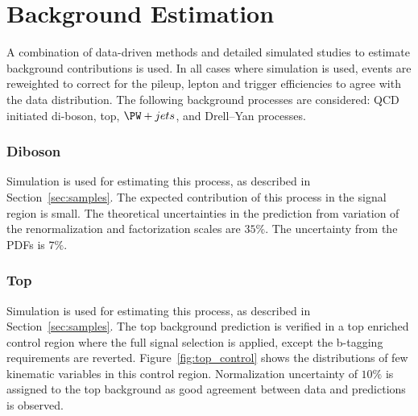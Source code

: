 \chapter{Background Estimation} %
\label{cha:background_estimation}
A combination of data-driven methods and detailed simulated studies to 
estimate background contributions is used. In all cases where simulation is used, events are reweighted to correct for the pileup, lepton and trigger efficiencies to agree with the data distribution. The following background processes are considered: QCD initiated di-boson, top, $\PW+jets$, and Drell--Yan processes. 

\subsection{Diboson}
Simulation is used for estimating this process, as described in Section~\ref{sec:samples}. The expected contribution of this process in the signal region is small. The theoretical uncertainties in the prediction from variation of the renormalization and factorization scales are $35\%$. The uncertainty from the PDFs is $7\%$.

\subsection{Top}
Simulation is used for estimating this process, as described in Section~\ref{sec:samples}. The top background prediction is verified in a top enriched control region where the full signal selection is applied, except the b-tagging requirements are reverted. Figure~\ref{fig:top_control} shows the distributions of few kinematic variables in this control region. Normalization uncertainty of $10\%$ is assigned to the top background as good agreement between data and predictions is observed. 

